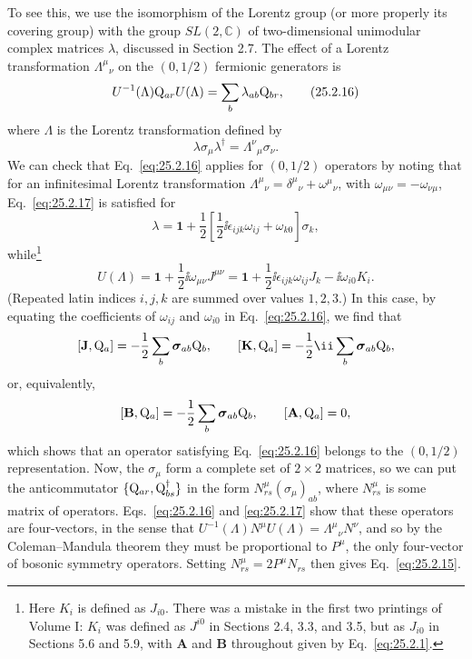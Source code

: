 To see this, we use the isomorphism of the Lorentz group (or more properly
its covering group) with the group \(SL(2,\mathbb C)\) of two-dimensional
unimodular complex matrices \(\lambda\), discussed in Section 2.7. The
effect of a Lorentz transformation \(\Lambda^\mu{}_\nu\) on the
\((0,1/2)\) fermionic generators is
\begin{equation}
U^{-1}(\Lambda)\mathrm{Q}_{ar}U(\Lambda)
=\sum_b\lambda_{ab}\mathrm{Q}_{br},
\tag{25.2.16}\label{eq:25.2.16}
\end{equation}
where \(\Lambda\) is the Lorentz transformation defined by
\begin{equation}
\lambda\sigma_\mu\lambda^\dagger
=\Lambda^\nu{}_\mu\sigma_\nu.
\tag{25.2.17}\label{eq:25.2.17}
\end{equation}
We can check that Eq.~\eqref{eq:25.2.16} applies for \((0,1/2)\) operators
by noting that for an infinitesimal Lorentz transformation
\(\Lambda^\mu{}_\nu=\delta^\mu{}_\nu+\omega^\mu{}_\nu\), with
\(\omega_{\mu\nu}=-\omega_{\nu\mu}\), Eq.~\eqref{eq:25.2.17} is satisfied
for
\[
\lambda
=\mathbf{1}
+\frac12\left[\frac12\ii\epsilon_{ijk}\omega_{ij}+\omega_{k0}\right]\sigma_k,
\]
while\footnote{Here \(K_i\) is defined as \(J_{i0}\). There was a mistake
in the first two printings of Volume I: \(K_i\) was defined as \(J^{i0}\)
in Sections 2.4, 3.3, and 3.5, but as \(J_{i0}\) in Sections 5.6 and 5.9,
with \(\mathbf A\) and \(\mathbf B\) throughout given by
Eq.~\eqref{eq:25.2.1}.}
\[
U(\Lambda)
=\mathbf{1}+\frac12\ii\omega_{\mu\nu}J^{\mu\nu}
=\mathbf{1}+\frac12\ii\epsilon_{ijk}\omega_{ij}J_k-\ii\omega_{i0}K_i.
\]
(Repeated latin indices \(i,j,k\) are summed over values \(1,2,3\).) In
this case, by equating the coefficients of \(\omega_{ij}\) and
\(\omega_{i0}\) in Eq.~\eqref{eq:25.2.16}, we find that
\[
[\mathbf J,\WeylQ_a]
=-\frac12\sum_b\boldsymbol{\sigma}_{ab}\WeylQ_b,
\qquad
[\mathbf K,\WeylQ_a]
=-\frac12\ii\sum_b\boldsymbol{\sigma}_{ab}\WeylQ_b,
\]
or, equivalently,
\[
[\mathbf B,\mathrm{Q}_a]
=-\frac12\sum_b\boldsymbol{\sigma}_{ab}\mathrm{Q}_b,
\qquad
[\mathbf A,\mathrm{Q}_a]=0,
\]
which shows that an operator satisfying Eq.~\eqref{eq:25.2.16} belongs to
the \((0,1/2)\) representation. Now, the \(\sigma_\mu\) form a complete
set of \(2\times2\) matrices, so we can put the anticommutator
\(\{\mathrm{Q}_{ar},\mathrm{Q}_{bs}^\dagger\}\) in the form
\(N^\mu_{rs}(\sigma_\mu)_{ab}\), where \(N^\mu_{rs}\) is some matrix of
operators. Eqs.~\eqref{eq:25.2.16} and \eqref{eq:25.2.17} show that these
operators are four-vectors, in the sense that
\(U^{-1}(\Lambda)N^\mu U(\Lambda)=\Lambda^\mu{}_\nu N^\nu\), and so by
the Coleman--Mandula theorem they must be proportional to \(P^\mu\), the
only four-vector of bosonic symmetry operators. Setting
\(N^\mu_{rs}=2P^\mu N_{rs}\) then gives Eq.~\eqref{eq:25.2.15}.

